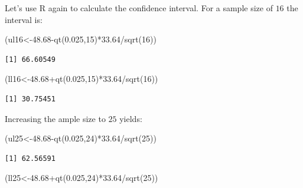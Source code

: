 \documentclass[
  letterpaper,
  DIV=11,
  numbers=noendperiod]{scrreprt}
\newenvironment{Shaded}{\begin{snugshade}}{\end{snugshade}}
\newcommand{\DecValTok}[1]{\textcolor[rgb]{0.68,0.00,0.00}{#1}}
\newcommand{\FloatTok}[1]{\textcolor[rgb]{0.68,0.00,0.00}{#1}}
\newcommand{\FunctionTok}[1]{\textcolor[rgb]{0.28,0.35,0.67}{#1}}
\newcommand{\NormalTok}[1]{\textcolor[rgb]{0.00,0.23,0.31}{#1}}
\newcommand{\OtherTok}[1]{\textcolor[rgb]{0.00,0.23,0.31}{#1}}
\newcommand{\SpecialCharTok}[1]{\textcolor[rgb]{0.37,0.37,0.37}{#1}}
\begin{document}
Let's use R again to calculate the confidence interval. For a sample
size of \(16\) the interval is:

\begin{Shaded}
\begin{Highlighting}[numbers=left,,]
\NormalTok{(ul16}\OtherTok{\textless{}{-}}\FloatTok{48.68}\SpecialCharTok{{-}}\FunctionTok{qt}\NormalTok{(}\FloatTok{0.025}\NormalTok{,}\DecValTok{15}\NormalTok{)}\SpecialCharTok{*}\FloatTok{33.64}\SpecialCharTok{/}\FunctionTok{sqrt}\NormalTok{(}\DecValTok{16}\NormalTok{))}
\end{Highlighting}
\end{Shaded}

\begin{verbatim}
[1] 66.60549
\end{verbatim}

\begin{Shaded}
\begin{Highlighting}[numbers=left,,]
\NormalTok{(ll16}\OtherTok{\textless{}{-}}\FloatTok{48.68}\SpecialCharTok{+}\FunctionTok{qt}\NormalTok{(}\FloatTok{0.025}\NormalTok{,}\DecValTok{15}\NormalTok{)}\SpecialCharTok{*}\FloatTok{33.64}\SpecialCharTok{/}\FunctionTok{sqrt}\NormalTok{(}\DecValTok{16}\NormalTok{))}
\end{Highlighting}
\end{Shaded}

\begin{verbatim}
[1] 30.75451
\end{verbatim}

Increasing the ample size to \(25\) yields:

\begin{Shaded}
\begin{Highlighting}[numbers=left,,]
\NormalTok{(ul25}\OtherTok{\textless{}{-}}\FloatTok{48.68}\SpecialCharTok{{-}}\FunctionTok{qt}\NormalTok{(}\FloatTok{0.025}\NormalTok{,}\DecValTok{24}\NormalTok{)}\SpecialCharTok{*}\FloatTok{33.64}\SpecialCharTok{/}\FunctionTok{sqrt}\NormalTok{(}\DecValTok{25}\NormalTok{))}
\end{Highlighting}
\end{Shaded}

\begin{verbatim}
[1] 62.56591
\end{verbatim}

\begin{Shaded}
\begin{Highlighting}[numbers=left,,]
\NormalTok{(ll25}\OtherTok{\textless{}{-}}\FloatTok{48.68}\SpecialCharTok{+}\FunctionTok{qt}\NormalTok{(}\FloatTok{0.025}\NormalTok{,}\DecValTok{24}\NormalTok{)}\SpecialCharTok{*}\FloatTok{33.64}\SpecialCharTok{/}\FunctionTok{sqrt}\NormalTok{(}\DecValTok{25}\NormalTok{))}
\end{Highlighting}
\end{Shaded}
\end{document}
